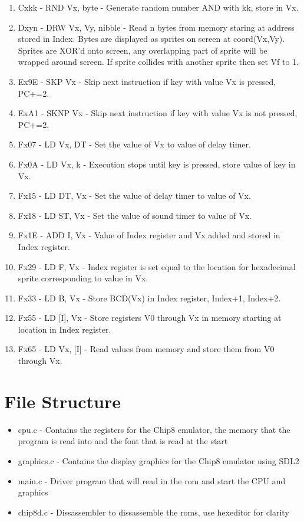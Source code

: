 \documentclass{article}
\begin{document}
\begin{enumerate}
	\item Cxkk - RND Vx, byte - Generate random number AND with kk, store in Vx.
	\item Dxyn - DRW Vx, Vy, nibble - Read n bytes from memory staring at address stored in Index. Bytes are displayed as sprites on screen at coord(Vx,Vy). Sprites are XOR'd onto screen, any overlapping part of sprite will be wrapped around screen. If sprite collides with another sprite then set Vf to 1.
	\item Ex9E - SKP Vx - Skip next instruction if key with value Vx is pressed, PC+=2.
	\item ExA1 - SKNP Vx - Skip next instruction if key with value Vx is not pressed, PC+=2.
	\item Fx07 - LD Vx, DT - Set the value of Vx to value of delay timer.
	\item Fx0A - LD Vx, k - Execution stops until key is pressed, store value of key in Vx.
	\item Fx15 - LD DT, Vx - Set the value of delay timer to value of Vx.
	\item Fx18 - LD ST, Vx - Set the value of sound timer to value of Vx.
	\item Fx1E - ADD I, Vx - Value of Index register and Vx added and stored in Index register.
	\item Fx29 - LD F, Vx - Index register is set equal to the location for hexadecimal sprite corresponding to value in Vx.
	\item Fx33 - LD B, Vx - Store BCD(Vx) in Index register, Index+1, Index+2.
	\item Fx55 - LD [I], Vx - Store registers V0 through Vx in memory starting at location in Index register.
	\item Fx65 - LD Vx, [I] - Read values from memory and store them from V0 through Vx.
\end{enumerate}

\section*{File Structure}
\begin{itemize}
	\item cpu.c - Contains the registers for the Chip8 emulator, the memory that the program is read into and the font that is read at the start
	\item graphics.c - Contains the display graphics for the Chip8 emulator using SDL2
	\item main.c - Driver program that will read in the rom and start the CPU and graphics
	\item chip8d.c - Dissassembler to dissassemble the roms, use hexeditor for clarity
\end{itemize}
\end{document}

